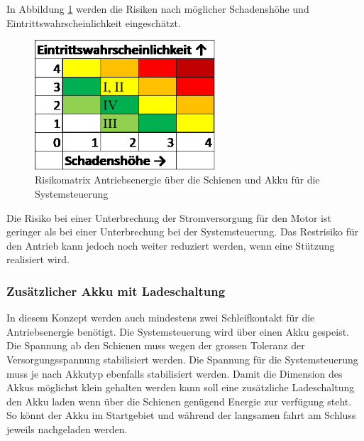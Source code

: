\documentclass[../../main.tex]{subfiles}
\begin{document}
    In Abbildung \ref{fig:strom_risikomatrix_akku} werden die Risiken nach möglicher Schadenshöhe und Eintrittswahrscheinlichkeit eingeschätzt.

    \begin{figure}[H]
        \centering
        \includegraphics[width=0.6\textwidth]{Strom_Risiko_Akku.png}
        \caption {Risikomatrix Antriebsenergie über die Schienen und Akku für die Systemsteuerung}
        \label{fig:strom_risikomatrix_akku}
    \end{figure}

    Die Risiko bei einer Unterbrechung der Stromversorgung für den Motor ist geringer als bei einer Unterbrechung bei der Systemsteuerung. Das Restrisiko für den Antrieb kann jedoch noch weiter reduziert werden, wenn eine Stützung realisiert wird.


    \subsubsection{Zusätzlicher Akku mit Ladeschaltung}
    In diesem Konzept werden auch mindestens zwei Schleifkontakt für die Antriebsenergie benötigt. Die Systemsteuerung wird über einen Akku gespeist. Die Spannung ab den Schienen muss wegen der grossen Toleranz der Versorgungsspannung stabilisiert werden. Die Spannung für die Systemsteuerung muss je nach Akkutyp ebenfalls stabilisiert werden.
    Damit die Dimension des Akkus möglichst klein gehalten werden kann soll eine zusätzliche Ladeschaltung den Akku laden wenn über die Schienen genügend Energie zur verfügung steht. So könnt der Akku im Startgebiet und während der langsamen fahrt am Schluss jeweils nachgeladen werden.
\end{document}
